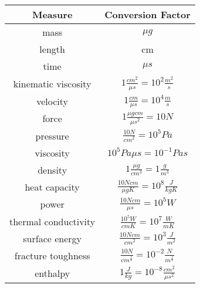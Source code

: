 \begin{tabular}{|c|c|}
\hline 
\bf{Measure} & \bf{Conversion Factor}     \\
\hline
mass	& $\mu g$               \\
length  & cm                    \\
time    & $\mu s$               \\ [1ex]
kinematic viscosity & $1\frac{\displaystyle cm^2}{\displaystyle \mu s} = 10^2 \frac{\displaystyle m^2}{\displaystyle s}$                          \\ [1ex]
velocity            & $1\frac{\displaystyle cm}{\displaystyle \mu s} = 10^4 \frac{\displaystyle m}{\displaystyle s}$                              \\ [2ex]
force               & $1\frac{\displaystyle \mu gcm}{\displaystyle \mu s^2} = 10 N$                                                               \\ [2ex]
pressure            & $\frac{\displaystyle 10 N}{\displaystyle cm^2} = 10^5 Pa$                                                                   \\ [1ex]
viscosity           & $10^5 Pa \mu s = 10^{-1} Pa s$                                                                                              \\ [1ex]
density             & $1\frac{\displaystyle \mu g}{\displaystyle cm^3} = 1\frac{\displaystyle g}{\displaystyle m^3}$                              \\ [1ex]
heat capacity       & $\frac{\displaystyle 10N cm}{\displaystyle \mu g K} = 10^8 \frac{\displaystyle J}{\displaystyle kg K}$                      \\ [2ex]
power               & $\frac{\displaystyle 10N cm}{\displaystyle \mu s} = 10^5 W$                                                                 \\ [1ex]
thermal conductivity& $\frac{\displaystyle 10^5 W}{\displaystyle cm K} = 10^7 \frac{\displaystyle W}{\displaystyle m K}$                          \\ [2ex]
surface energy      & $\frac{\displaystyle 10 N cm}{\displaystyle cm^2} = 10^3 \frac{\displaystyle J}{\displaystyle m^2}$                         \\ [2ex]
fracture toughness  & $\frac{\displaystyle 10 N}{\displaystyle cm^{\frac{3}{2}}} = 10^{-2} \frac{\displaystyle N}{\displaystyle m^{\frac{3}{2}}}$ \\ [2ex]
enthalpy            & $1\frac{\displaystyle J}{\displaystyle kg} = 10^{-8} \frac{\displaystyle cm^2}{\displaystyle \mu s^2}$                      \\ [2ex]
\hline
\end{tabular}



